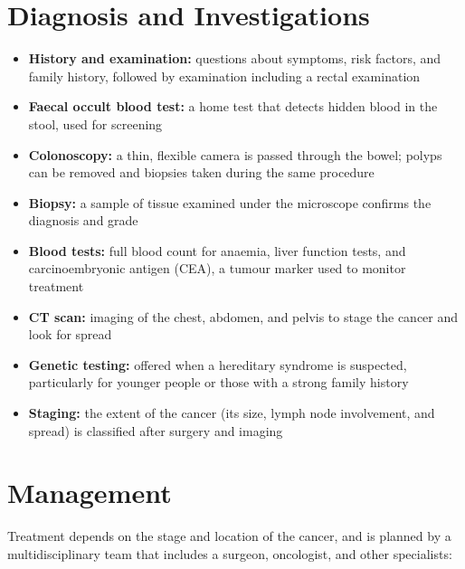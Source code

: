 \section*{Diagnosis and Investigations}
\begin{itemize}
    \item \textbf{History and examination:} questions about symptoms, risk factors, and family history, followed by examination including a rectal examination
    \item \textbf{Faecal occult blood test:} a home test that detects hidden blood in the stool, used for screening
    \item \textbf{Colonoscopy:} a thin, flexible camera is passed through the bowel; polyps can be removed and biopsies taken during the same procedure
    \item \textbf{Biopsy:} a sample of tissue examined under the microscope confirms the diagnosis and grade
    \item \textbf{Blood tests:} full blood count for anaemia, liver function tests, and carcinoembryonic antigen (CEA), a tumour marker used to monitor treatment
    \item \textbf{CT scan:} imaging of the chest, abdomen, and pelvis to stage the cancer and look for spread
    \item \textbf{Genetic testing:} offered when a hereditary syndrome is suspected, particularly for younger people or those with a strong family history
    \item \textbf{Staging:} the extent of the cancer (its size, lymph node involvement, and spread) is classified after surgery and imaging
\end{itemize}

\section*{Management}
Treatment depends on the stage and location of the cancer, and is planned by a multidisciplinary team that includes a surgeon, oncologist, and other specialists:

